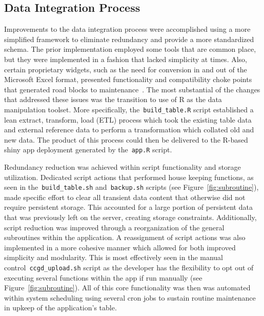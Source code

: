 \documentclass[10pt]{report}
\begin{document}
\subsection{Data Integration Process}
Improvements to the data integration process were accomplished using a more simplified framework to eliminate redundancy and provide a more standardized schema. The prior implementation employed some tools that are common place, but they were implemented in a fashion that lacked simplicity at times. Also, certain proprietary widgets, such as the need for conversion in and out of the Microsoft Excel format, presented functionality and compatibility choke points that generated road blocks to maintenance~\cite{abbottCandidateCancerGene2015a}. The most substantial of the changes that addressed these issues was the transition to use of R as the data manipulation toolset. More specifically, the~\texttt{build\_table.R} script established a lean extract, transform, load (ETL) process which took the existing table data and external reference data to perform a transformation which collated old and new data. The product of this process could then be delivered to the R-based shiny app deployment generated by the~\texttt{app.R} script.

Redundancy reduction was achieved within script functionality and storage utilization. Dedicated script actions that performed house keeping functions, as seen in the~\texttt{build\_table.sh} and~\texttt{backup.sh} scripts (see Figure~\ref{fig:subroutine}), made specific effort to clear all transient data content that otherwise did not require persistent storage. This accounted for a large portion of persistent data that was previously left on the server, creating storage constraints. Additionally, script reduction was improved through a reorganization of the general subroutines within the application. A reassignment of script actions was also implemented in a more cohesive manner which allowed for both improved simplicity and modularity. This is most effectively seen in the manual control~\texttt{ccgd\_upload.sh} script as the developer has the flexibility to opt out of executing several functions within the app if run manually (see Figure~\ref{fig:subroutine}). All of this core functionality was then was automated within system scheduling using several cron jobs to sustain routine maintenance in upkeep of the application's table.
\end{document}
